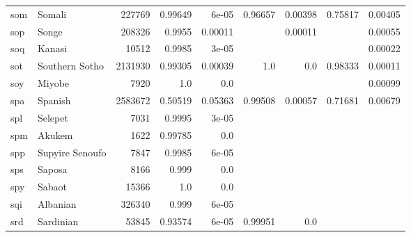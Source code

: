 \documentclass[11pt]{article}
\begin{document}
\begin{table*}[h]
{\begin{tabular}{llrrrrrrr}
som         & Somali         & 227769         & 0.99649         & 6e-05         & 0.96657         & 0.00398         & 0.75817         & 0.00405         \\

sop         & Songe         & 208326         & 0.9955         & 0.00011         &          & 0.00011         &          & 0.00055         \\

soq         & Kanasi         & 10512         & 0.9985         & 3e-05         &          &          &          & 0.00022         \\

sot         & Southern Sotho         & 2131930         & 0.99305         & 0.00039         & 1.0         & 0.0         & 0.98333         & 0.00011         \\

soy         & Miyobe         & 7920         & 1.0         & 0.0         &          &          &          & 0.00099         \\

spa         & Spanish         & 2583672         & 0.50519         & 0.05363         & 0.99508         & 0.00057         & 0.71681         & 0.00679         \\

spl         & Selepet         & 7031         & 0.9995         & 3e-05         &          &          &          &          \\

spm         & Akukem         & 1622         & 0.99785         & 0.0         &          &          &          &          \\

spp         & Supyire Senoufo         & 7847         & 0.9985         & 6e-05         &          &          &          &          \\

sps         & Saposa         & 8166         & 0.999         & 0.0         &          &          &          &          \\

spy         & Sabaot         & 15366         & 1.0         & 0.0         &          &          &          &          \\

sqi         & Albanian         & 326340         & 0.999         & 6e-05         &          &          &          &          \\

srd         & Sardinian         & 53845         & 0.93574         & 6e-05         & 0.99951         & 0.0         &          &          \\


\end{tabular}}
\end{table*}
\end{document}
